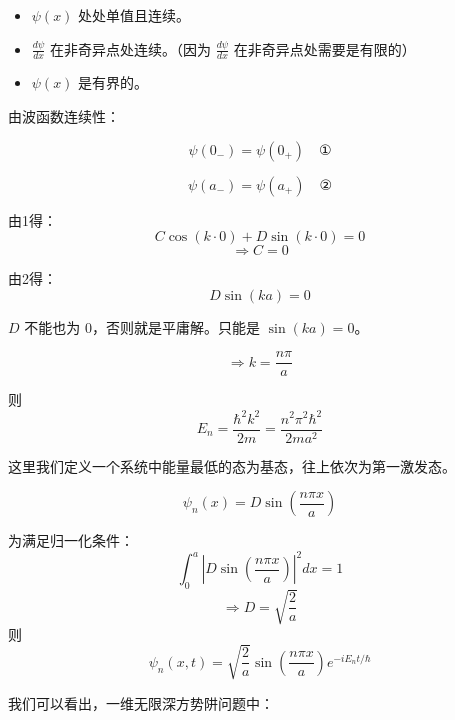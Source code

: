 \documentclass[lang=cn,10pt]{elegantbook}
\begin{document}
\begin{itemize}
	\item $\psi(x)$ 处处单值且连续。
	\item $\frac{d\psi}{dx}$ 在非奇异点处连续。（因为 $\frac{d\psi}{dx}$ 在非奇异点处需要是有限的）
	\item $\psi(x)$ 是有界的。
\end{itemize}

由波函数连续性：

\begin{equation*}
	\psi(0_-) = \psi(0_+) \quad \text{①}
\end{equation*}

\begin{equation*}
	\psi(a_-) = \psi(a_+) \quad \text{②}
\end{equation*}

由1得：
\[
C\cos(k \cdot 0) + D\sin(k \cdot 0) = 0
\]
\[
\Rightarrow C = 0
\]

由2得：
\[
D\sin(ka) = 0
\]

\(D\) 不能也为 0，否则就是平庸解。只能是 \(\sin(ka) = 0\)。

\[
\Rightarrow k = \frac{n\pi}{a}
\]

则
\[
E_n = \frac{\hbar^2 k^2}{2m} = \frac{n^2 \pi^2 \hbar^2}{2ma^2}
\]

这里我们定义一个系统中能量最低的态为基态，往上依次为第一激发态。

\[
\psi_n(x) = D\sin\left(\frac{n\pi x}{a}\right)
\]

为满足归一化条件：
\[
\int_0^a \left|D\sin\left(\frac{n\pi x}{a}\right)\right|^2 dx = 1
\]
\[
\Rightarrow D = \sqrt{\frac{2}{a}}
\]
则
\[
\psi_n(x,t) = \sqrt{\frac{2}{a}} \sin\left(\frac{n\pi x}{a}\right) e^{-iE_n t/\hbar}
\]

我们可以看出，一维无限深方势阱问题中：
\end{document}

